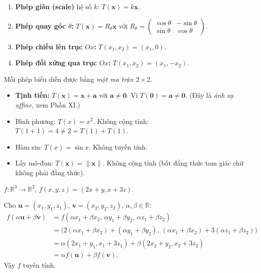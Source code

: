 \documentclass[12pt,a4paper]{article}
\begin{document}
\begin{vidu}[title={Bốn ánh xạ tuyến tính kinh điển trên $\mathbb{R}^2$}]
\begin{enumerate}
  \item \textbf{Phép giãn (scale)} hệ số $k$: $T(\mathbf{x}) = k\mathbf{x}$.
  \item \textbf{Phép quay góc $\theta$:} $T(\mathbf{x}) = R_\theta \mathbf{x}$ với $R_\theta = \begin{pmatrix}\cos\theta & -\sin\theta\\ \sin\theta & \cos\theta\end{pmatrix}$.
  \item \textbf{Phép chiếu lên trục $Ox$:} $T(x_1, x_2) = (x_1, 0)$.
  \item \textbf{Phép đối xứng qua trục $Ox$:} $T(x_1, x_2) = (x_1, -x_2)$.
\end{enumerate}
Mỗi phép biểu diễn được bằng \emph{một ma trận $2 \times 2$}.
\end{vidu}

\begin{phanvidu}[title={Những ánh xạ KHÔNG tuyến tính}]
\begin{itemize}
  \item \textbf{Tịnh tiến:} $T(\mathbf{x}) = \mathbf{x} + \mathbf{a}$ với $\mathbf{a} \ne \mathbf{0}$. Vì $T(\mathbf{0}) = \mathbf{a} \ne \mathbf{0}$. (Đây là \emph{ánh xạ affine}, xem Phần XI.)
  \item Bình phương: $T(x) = x^2$. Không cộng tính: $T(1+1) = 4 \ne 2 = T(1) + T(1)$.
  \item Hàm sin: $T(x) = \sin x$. Không tuyến tính.
  \item Lấy mô-đun: $T(\mathbf{x}) = \|\mathbf{x}\|$. Không cộng tính (bất đẳng thức tam giác chứ không phải đẳng thức).
\end{itemize}
\end{phanvidu}

\begin{vidu}[title={Kiểm tra ánh xạ là tuyến tính}]
$f: \mathbb{R}^3 \to \mathbb{R}^2$, $f(x, y, z) = (2x + y, x + 3z)$.

Cho $\mathbf{u} = (x_1, y_1, z_1)$, $\mathbf{v} = (x_2, y_2, z_2)$, $\alpha, \beta \in \mathbb{R}$:
\begin{align*}
  f(\alpha\mathbf{u} + \beta\mathbf{v}) &= f(\alpha x_1 + \beta x_2,\, \alpha y_1 + \beta y_2,\, \alpha z_1 + \beta z_2)\\
  &= \bigl(2(\alpha x_1 + \beta x_2) + (\alpha y_1 + \beta y_2),\, (\alpha x_1 + \beta x_2) + 3(\alpha z_1 + \beta z_2)\bigr)\\
  &= \alpha(2x_1 + y_1, x_1 + 3z_1) + \beta(2x_2 + y_2, x_2 + 3z_2)\\
  &= \alpha f(\mathbf{u}) + \beta f(\mathbf{v}).
\end{align*}
Vậy $f$ tuyến tính.
\end{vidu}
\end{document}
